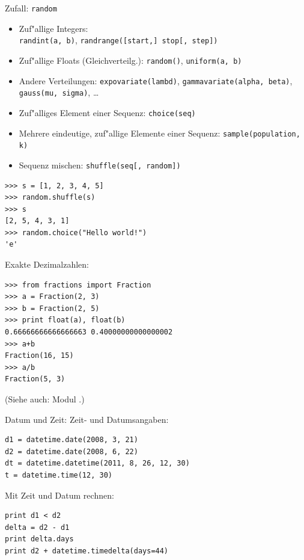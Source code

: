 \begin{frame}[fragile]{Zufall: \texttt{random}}
\begin{itemize}
\item Zuf"allige Integers: \\ \texttt{randint(a, b)},  \texttt{randrange([start,] stop[, step])}
\item Zuf"allige Floats (Gleichverteilg.): \texttt{random()}, \texttt{uniform(a, b)}
\item Andere Verteilungen: \texttt{expovariate(lambd)}, \texttt{gammavariate(alpha, beta)}, \texttt{gauss(mu, sigma)}, \dots
\item Zuf"alliges Element einer Sequenz: \texttt{choice(seq)}
\item Mehrere eindeutige, zuf"allige Elemente einer Sequenz: \texttt{sample(population, k)}
\item Sequenz mischen: \texttt{shuffle(seq[, random])}
\end{itemize}
\begin{lstlisting}[style=Python]
>>> s = [1, 2, 3, 4, 5]
>>> random.shuffle(s)
>>> s
[2, 5, 4, 3, 1]
>>> random.choice("Hello world!")
'e'
\end{lstlisting}
\end{frame}


\begin{frame}[fragile]{Exakte Dezimalzahlen: }

\begin{lstlisting}
>>> from fractions import Fraction
>>> a = Fraction(2, 3)
>>> b = Fraction(2, 5)
>>> print float(a), float(b)
0.66666666666666663 0.40000000000000002
>>> a+b
Fraction(16, 15)
>>> a/b
Fraction(5, 3)
\end{lstlisting}

(Siehe auch: Modul .)
\end{frame}


\begin{frame}[fragile]{Datum und Zeit: }
Zeit- und Datumsangaben:
\begin{lstlisting}
d1 = datetime.date(2008, 3, 21)  
d2 = datetime.date(2008, 6, 22)
dt = datetime.datetime(2011, 8, 26, 12, 30)
t = datetime.time(12, 30)
\end{lstlisting}
Mit Zeit und Datum rechnen:
\begin{lstlisting}
print d1 < d2
delta = d2 - d1
print delta.days
print d2 + datetime.timedelta(days=44)
\end{lstlisting}
\end{frame}

